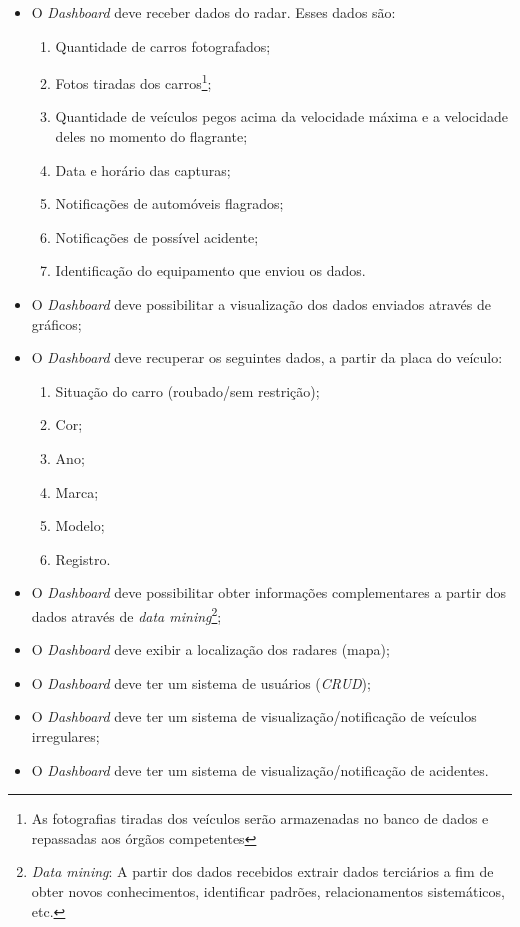 \begin{itemize}
    \item O \textit{Dashboard} deve receber dados do radar. Esses dados são:
    \begin{enumerate}
        \item Quantidade de carros fotografados;
        \item Fotos tiradas dos carros\footnote{As fotografias tiradas dos veículos serão armazenadas no banco de dados e repassadas aos órgãos competentes};
        \item Quantidade de veículos pegos acima da velocidade máxima e a velocidade deles no momento do flagrante;
        \item Data e horário das capturas;
        \item Notificações de automóveis flagrados;
        \item Notificações de possível acidente;
        \item Identificação do equipamento que enviou os dados.
    \end{enumerate}

    \item O \textit{Dashboard} deve possibilitar a visualização dos dados enviados através de gráficos;

    \item O \textit{Dashboard} deve recuperar os seguintes dados, a partir da placa do veículo:
    \begin{enumerate}
        \item Situação do carro (roubado/sem restrição);
        \item Cor;
        \item Ano;
        \item Marca;
        \item Modelo;
        \item Registro.
    \end{enumerate}

    \item O \textit{Dashboard} deve possibilitar obter informações complementares a partir dos dados através de \textit{data mining}\footnote{\textit{Data mining}: A partir dos dados recebidos extrair dados terciários a fim de obter novos conhecimentos, identificar padrões, relacionamentos sistemáticos, etc.};
    \item O \textit{Dashboard} deve exibir a localização dos radares (mapa);
    \item O \textit{Dashboard} deve ter um sistema de usuários (\textit{CRUD});
    \item O \textit{Dashboard} deve ter um sistema de visualização/notificação de veículos irregulares;
    \item O \textit{Dashboard} deve ter um sistema de visualização/notificação de acidentes.
\end{itemize}

